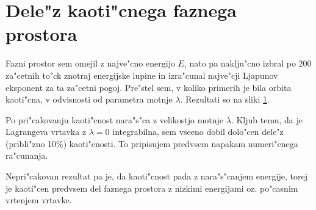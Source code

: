 \documentclass[a4paper,10pt]{article}
\begin{document}
\section{Dele"z kaoti"cnega faznega prostora}

Fazni prostor sem omejil z najve"cno energijo $E$, nato pa naklju"cno izbral po 200 za"cetnih to"ck znotraj energijske lupine in izra"cunal najve"cji Ljapunov eksponent za ta za"cetni pogoj. Pre"stel sem, v koliko primerih je bila orbita kaoti"cna, v odvisnosti od parametra motnje $\lambda$. Rezultati so na sliki \ref{fig:kaos}. 

\begin{figure}[H]
 \label{fig:kaos}
 
\end{figure}

Po pri"cakovanju kaoti"cnost nara"s"ca z velikostjo motnje $\lambda$. Kljub temu, da je Lagrangeva vrtavka z $\lambda=0$ integrabilna, sem vseeno dobil dolo"cen dele"z (pribli"zno 10\%) kaoti"cnosti. To pripisujem predvsem napakam numeri"cnega ra"cunanja. 

Nepri"cakovan rezultat pa je, da kaoti"cnost pada z nara"s"canjem energije, torej je kaoti"cen predvsem del faznega prostora z nizkimi energijami oz. po"casnim vrtenjem vrtavke. 
\end{document}
